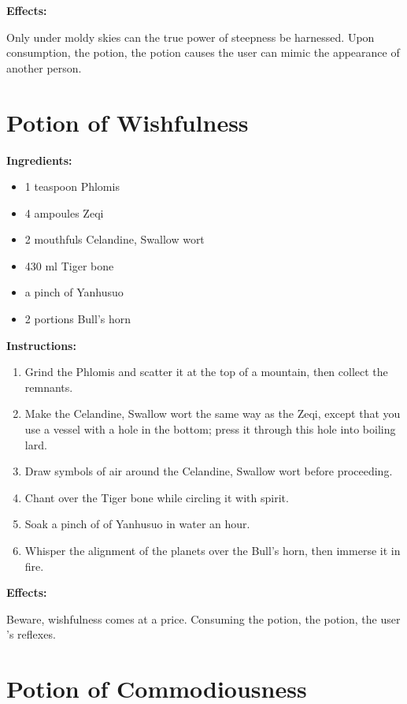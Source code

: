 \documentclass{article}
\begin{document}
\textbf{Effects:}

Only under moldy skies can the true power of steepness be harnessed. Upon consumption, the potion, the potion causes the user can mimic the appearance of another person.

\newpage
\section*{Potion of Wishfulness}

\textbf{Ingredients:}

\begin{itemize}
  \item 1 teaspoon Phlomis
  \item 4 ampoules Zeqi
  \item 2 mouthfuls Celandine, Swallow wort
  \item 430 ml Tiger bone
  \item a pinch of Yanhusuo
  \item 2 portions Bull's horn
\end{itemize}

\textbf{Instructions:}

\begin{enumerate}
  \item Grind the Phlomis and scatter it at the top of a mountain, then collect the remnants.
  \item Make the Celandine, Swallow wort the same way as the Zeqi, except that you use a vessel with a hole in the bottom; press it through this hole into boiling lard.
  \item Draw symbols of air around the Celandine, Swallow wort before proceeding.
  \item Chant over the Tiger bone while circling it with spirit.
  \item Soak a pinch of of Yanhusuo in water an hour.
  \item Whisper the alignment of the planets over the Bull's horn, then immerse it in fire.
\end{enumerate}

\textbf{Effects:}

Beware, wishfulness comes at a price. Consuming the potion, the potion, the user 's reflexes.

\newpage
\section*{Potion of Commodiousness}
\end{document}
